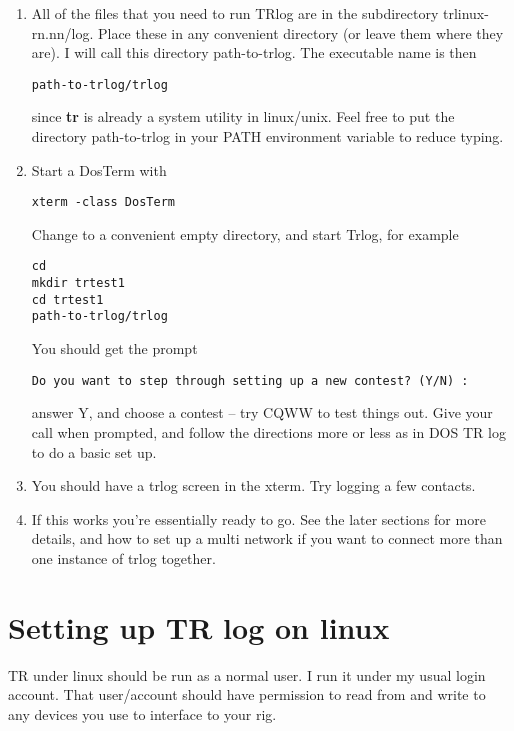 \documentclass[12pt]{article}
\begin{document}
\begin{enumerate}
{\em It is absolutely necessary that
the DosTerm be 80 columns and 25 rows,
and the BigDosTerm 80 columns and 50 rows. }
You can check this with the commands
\begin{verbatim}
set |grep COLUMNS
set |grep LINES
\end{verbatim}
the first should print COLUMNS=80 and the second LINES=25 or LINES=50 depending
on whether you are in a DosTerm or a BigDosTerm. If these do not
match, you likely have a font that is too big to allow the xterm its
full size. In that case change the faceSize
value in the .Xresources file.

\item
All of the files that you need to run TRlog are in the subdirectory
trlinux-rn.nn/log.
Place these in any convenient directory (or leave them where they are).
I will call this directory path-to-trlog.
The executable name is then
\begin{verbatim}
path-to-trlog/trlog
\end{verbatim}
since {\bf tr} is already a system utility in
linux/unix. Feel free to put the directory path-to-trlog in your PATH
environment variable to reduce typing.
\item
Start a DosTerm  with
\begin{verbatim}
xterm -class DosTerm
\end{verbatim}
Change to a convenient empty directory, and start Trlog, for example
\begin{verbatim}
cd
mkdir trtest1
cd trtest1
path-to-trlog/trlog
\end{verbatim}
You should get the prompt
\begin{verbatim}
Do you want to step through setting up a new contest? (Y/N) :
\end{verbatim}
answer Y, and choose a contest
-- try CQWW to test things out. 
Give your call when prompted, and follow the directions more or less
as in DOS TR log to do a basic set up.
\item
You should have a trlog screen in the xterm.
Try logging a few contacts. 
\item
If this works you're essentially ready to go. See the later
sections for more details, and how to set up a multi network if you
want to connect more than one instance of trlog together.
\end{enumerate}

\section{Setting up TR log on linux}
TR under linux should be run as a normal user. I run it under my usual
login account. That user/account should have permission to read from and
write to any devices you use to interface to your rig.
\end{document}
